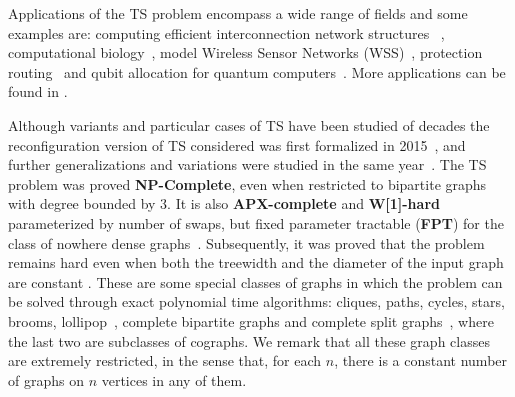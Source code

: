 \documentclass[msc,english,table,xcdraw]{ppgccufmg}
\begin{document}
Applications of the TS problem encompass a wide range of fields and some examples are: computing efficient interconnection network structures 
~\cite{Annexstein:1990}, computational biology~\cite
{Bafna:1998,Lenwood:2003}, model Wireless Sensor Networks (WSS)~\cite
{Wang:2007}, protection routing~\cite{Pai:2020} and qubit allocation for 
quantum computers~\cite{Siraichi:2018,Siraichi:2019}.
More applications can be found in \cite{Oswin:2021}.


Although variants and particular cases of TS have been studied of decades the reconfiguration version of TS considered was first formalized in 2015~\cite{Yamanaka:2015}, and further generalizations and variations were studied in the same year~\cite{Yamanaka:Colored:2015}.
The TS problem was proved \textbf{NP-Complete}, even when restricted to bipartite graphs with degree bounded by 3. 
It is also \textbf{APX-complete} and \textbf{W[1]-hard} parameterized by number of swaps, but fixed parameter tractable (\textbf{FPT}) for the class of nowhere dense
graphs~\cite{Kawahara:2017,Miltzow:2016}.
Subsequently, it was proved that the problem remains hard even when both the treewidth and the diameter of the input graph are constant \cite{Bonnet:2018}.
These are some special classes of graphs in which the problem can be solved through exact polynomial time algorithms: cliques, paths, cycles, stars, brooms, 
lollipop~\cite{Kawahara:2017}, complete bipartite graphs and complete split graphs~\cite{Ahmad:2019}, where the last two are subclasses of cographs. We remark that all these graph classes are extremely restricted, in the sense that, for each $n$, there is a constant number of graphs on $n$ vertices in any of them.
\end{document}
